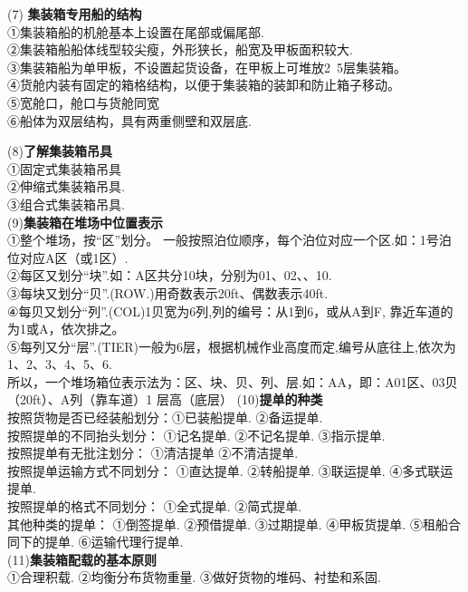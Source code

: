 \documentclass[UTF8]{ctexart}
\begin{document}
\noindent (7) \textbf{集装箱专用船的结构}  \\ ①集装箱船的机舱基本上设置在尾部或偏尾部.
\\ ②集装箱船船体线型较尖瘦，外形狭长，船宽及甲板面积较大.
\\ ③集装箱船为单甲板，不设置起货设备，在甲板上可堆放2~5层集装箱。
\\ ④货舱内装有固定的箱格结构，以便于集装箱的装卸和防止箱子移动。
\\ ⑤宽舱口，舱口与货舱同宽
\\ ⑥船体为双层结构，具有两重侧壁和双层底.

\noindent (8)\small  \textbf{了解集装箱吊具}\\ \small ①固定式集装箱吊具
\\ ②伸缩式集装箱吊具.
\\ ③组合式集装箱吊具.
\\(9)\small  \textbf{集装箱在堆场中位置表示}\\ \small ①整个堆场，按“区”划分。
一般按照泊位顺序，每个泊位对应一个区.如：1号泊位对应A区（或1区）.
\\ ②每区又划分“块”.如：A区共分10块，分别为01、02、、10.
\\ ③每块又划分“贝”.(ROW.)用奇数表示20ft、偶数表示40ft.
\\ ④每贝又划分“列”.(COL)1贝宽为6列,列的编号：从1到6，或从A到F, 靠近车道的为1或A，依次排之。
\\ ⑤每列又分“层”.(TIER)一般为6层，根据机械作业高度而定,编号从底往上,依次为1、2、3、4、5、6.
\\ 所以，一个堆场箱位表示法为：区、块、贝、列、层.如：A\quad A，即：A01区、03贝（20ft）、A列（靠车道）1 层高（底层）
\noindent (10)\small  \textbf{提单的种类}\\ \small  按照货物是否已经装船划分：①已装船提单.
②备运提单.
\\按照提单的不同抬头划分：
①记名提单.
 ②不记名提单.
 ③指示提单.
\\按照提单有无批注划分：
 ①清洁提单
 ②不清洁提单.
\\ 按照提单运输方式不同划分：
①直达提单.
 ②转船提单.
③联运提单.
④多式联运提单.
\\ 按照提单的格式不同划分：
①全式提单.
 ②简式提单.
\\ 其他种类的提单：
 ①倒签提单.
②预借提单.
 ③过期提单.
④甲板货提单.
 ⑤租船合同下的提单.
⑥运输代理行提单.
\\
\noindent (11)\small  \textbf{集装箱配载的基本原则}\\ \small ①合理积载.
②均衡分布货物重量.
 ③做好货物的堆码、衬垫和系固.
\end{document}
